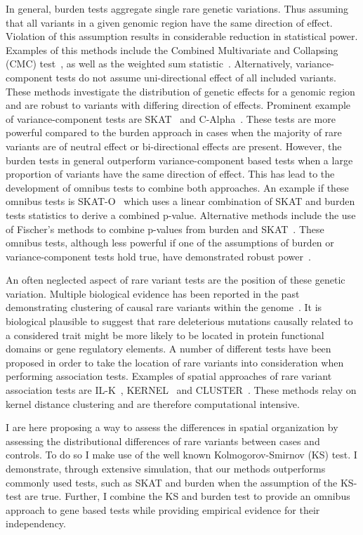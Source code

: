 In general, burden tests aggregate single rare genetic variations.
Thus assuming that all variants in a given genomic region have the same direction of effect.
Violation of this assumption results in considerable reduction in statistical power.
Examples of this methods include the Combined Multivariate and Collapsing (CMC) test~\cite{Li2008}, as well as the weighted sum statistic~\cite{Madsen2009}.
Alternatively, variance-component tests do not assume uni-directional effect of all included variants. 
These methods investigate the distribution of genetic effects for a genomic region and are robust to variants with differing direction of effects.
Prominent example of variance-component tests are SKAT~\cite{Wu2011} and C-Alpha~\cite{Neale2011}.
These tests are more powerful compared to the burden approach in cases when the majority of rare variants are of neutral effect or bi-directional effects are present.
However, the burden tests in general outperform variance-component based tests when a large proportion of variants have the same direction of effect.
This has lead to the development of omnibus tests to combine both approaches.
An example if these omnibus tests is SKAT-O~\cite{Lee2012a} which uses a linear combination of SKAT and burden tests statistics to derive a combined p-value.
Alternative methods include the use of Fischer's methods to combine p-values from burden and SKAT~\cite{Derkach2013a}.
These omnibus tests, although less powerful if one of the assumptions of burden or variance-component tests hold true, have demonstrated robust power~\cite{Lee2014}. 

An often neglected aspect of rare variant tests are the position of these genetic variation.
Multiple biological evidence has been reported in the past demonstrating clustering of causal rare variants within the genome~\cite{Ionita-Laza2012}.%
It is biological plausible to suggest that rare deleterious mutations causally related to a considered trait might be more likely to be located in protein functional domains or gene regulatory elements. %
A number of different tests have been proposed in order to take the location of rare variants into consideration when performing association tests.
Examples of spatial approaches of rare variant association tests are IL-K~\cite{Ionita-Laza2012}, KERNEL~\cite{Schaid2013} and CLUSTER~\cite{Lin2014}.
These methods relay on kernel distance clustering and are therefore computational intensive. %

I are here proposing a way to assess the differences in spatial organization by assessing the distributional differences of rare variants between cases and controls.
To do so I make use of the well known Kolmogorov-Smirnov (KS) test.
I demonstrate, through extensive simulation, that our methods outperforms commonly used tests, such as SKAT and burden when the assumption of the KS-test are true.
Further, I combine the KS and burden test to provide an omnibus approach to gene based tests while providing empirical evidence for their independency.
